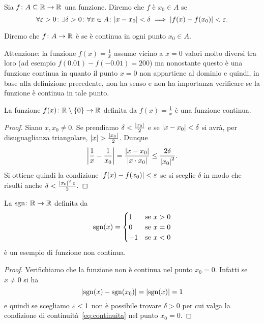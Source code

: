 \begin{definition}[continuità su $\RR$]
\label{def:continua}%
%
%
Sia $f\colon A \subseteq \mathbb R \to \mathbb R$ una funzione. Diremo che
$f$ è  $x_0\in A$ se
\begin{equation}\label{eq:continuita}
\forall \varepsilon>0 \colon \exists \delta>0 \colon
\forall x\in A\colon
{\left|x-x_0\right|} < \delta \implies {\left|f(x)-f(x_0)\right|} < \varepsilon.
\end{equation}

Diremo che $f\colon A \to \mathbb R$ è  se è continua
in ogni punto $x_0 \in A$.
\end{definition}

Attenzione: la funzione $f(x)=\frac{1}{x}$
assume vicino a $x=0$ valori molto diversi tra loro (ad esempio $f(0.01)-f(-0.01)=200$)
ma nonostante questo è una funzione continua in quanto il punto
$x=0$ non appartiene al dominio e quindi,
in base alla definizione precedente, non ha senso e non ha importanza
verificare se la funzione è continua in tale punto.

\begin{theorem}
\label{th:cont_reciproco}%
La funzione $f(x)\colon \mathbb R\setminus{\left\{ 0 \right\}}\to \mathbb R$ definita
da $f(x)=\frac 1 x$ è una funzione continua.
\end{theorem}
%
\begin{proof}
Siano $x,x_0\neq 0$.
Se prendiamo $\delta < \frac{{\left|x_0\right|}}2$
e se ${\left|x-x_0\right|} < \delta$ si avrà,
per disuguaglianza triangolare,
${\left|x\right|} > \frac{{\left|x_0\right|}}2$. Dunque
\[
{\left|\frac 1 x - \frac 1 {x_0}\right|}
= \frac{{\left|x-x_0\right|}}{{\left|x\cdot x_0\right|}}
\le \frac{2\delta}{{\left|x_0\right|}^2}.
\]
Si ottiene quindi la condizione ${\left|f(x)-f(x_0)\right|}<\varepsilon$
se si sceglie $\delta$ in modo che
risulti anche $\delta < \frac{{\left|x_0\right|}^2\cdot \varepsilon}{2}$.
\end{proof}

\begin{example}
La  $\operatorname{sgn}\colon \mathbb R \to \mathbb R$ definita da
\[
  \operatorname{sgn}(x) = \begin{cases}
  1 & \text{se $x> 0$}\\
  0 & \text{se $x=0$}\\
  -1 & \text{se $x<0$}
  \end{cases}
\]
è un esempio di funzione non continua.
\end{example}
%
\begin{proof}
Verifichiamo che la funzione non è continua
nel punto $x_0=0$.
Infatti se $x\neq 0$ si ha
\[
{\left|\operatorname{sgn}(x)-\operatorname{sgn}(x_0)\right|} = {\left|\operatorname{sgn}(x)\right|} = 1
\]
e quindi se scegliamo $\varepsilon<1$ non è possibile
trovare $\delta>0$ per cui valga la condizione
di continuità~\eqref{eq:continuita}
nel punto $x_0=0$.
\end{proof}

